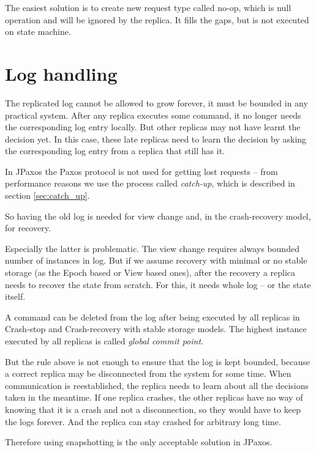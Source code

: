 The easiest solution is to create new request type called no-op, which is null operation and will be ignored by the replica. It fills the gaps, but is not executed on state machine.

\section{Log handling}

The replicated log cannot be allowed to grow forever, it must be bounded in any practical system. After any replica executes some command, it no longer needs the corresponding log entry locally. But other replicas may not have learnt the decision yet. In this case, these late replicas need to learn the decision by asking the corresponding log entry from a replica that still has it.

In JPaxos the Paxos protocol is not used for getting lost requests -- from performance reasons we use the process called \textit{catch-up}, which is described in section \ref{sec:catch_up}.

So having the old log is needed for view change and, in the crash-recovery model, for recovery.

Especially the latter is problematic. The view change requires always bounded number of instances in log. But if we assume recovery with minimal or no stable storage (as the Epoch based or View based ones), after the recovery a replica needs to recover the state from scratch. For this, it needs whole log -- or the state itself.


A command can be deleted from the log after being executed by all replicas in Crash-stop and Crash-recovery with stable storage models. The highest instance executed by all replicas is called \emph{global commit point}.

But the rule above is not enough to ensure that the log is kept bounded, because a correct replica may be disconnected from the system for some time. When communication is reestablished, the replica needs to learn about all the decisions taken in the meantime. If one replica crashes, the other replicas have no way of knowing that it is a crash and not a disconnection, so they would have to keep the logs forever. And the replica can stay crashed for arbitrary long time.

Therefore using snapshotting is the only acceptable solution in JPaxos.


